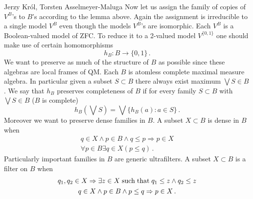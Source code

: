 \begin{artengenv2auth}{Jerzy Kr\'ol, Torsten Asselmeyer-Maluga}
Now let us assign the family of copies of $V^B$'s to $B$'s according to the lemma above. Again the assignment is irreducible to a single model $V^B$ even though the models $V^B$'s are isomorphic. Each $V^B$ is a Boolean-valued model of ZFC. To reduce it to a 2-valued model $V^{\{0,1\}}$ one should make use of certain homomorphisms \[h_B:B\to \{0,1\}\,. \] 
We want to preserve as much of the structure of $B$ as possible since these algebras are local frames of QM. Each $B$ is atomless complete maximal measure algebra. In particular given a subset $S\subset B$ there always exist maximum $\bigvee S\in B$. We say that $h_B$ preserves completeness of $B$ if for every family $S\subset B$ with $\bigvee S \in B$ ($B$ is complete)
\[h_B(\bigvee S)=\bigvee \{h_B(a):a\in S\}\,. \]
Moreover we want to preserve dense families in $B$. A subset $X\subset B$ is dense in $B$ when 
\begin{gather}
q\in X \wedge p\in B \wedge q\leq p \Rightarrow p\in X\\
\forall p\in B \exists q\in X (p\leq q)\,.    
\end{gather}
Particularly important families in $B$ are generic ultrafilters. A subset $X\subset B$ is a filter on $B$ when
\begin{gather}
  q_1, q_2\in X \Rightarrow \exists z\in X \; {\rm such\; that}\; q_1\leq z \wedge q_2 \leq z \\
 q\in X \wedge p\in B \wedge p\leq q \Rightarrow p\in X\,. 
\end{gather}


\end{artengenv2auth}
